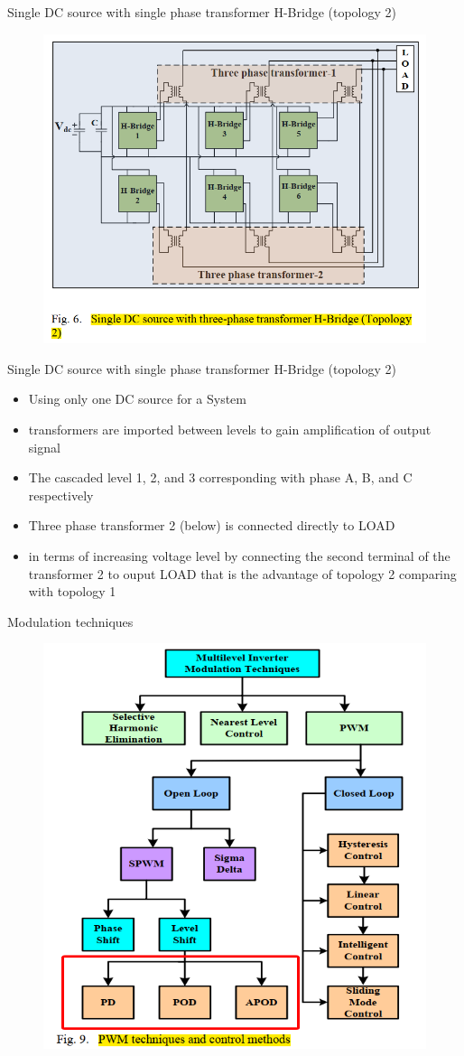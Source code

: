 \documentclass[
	11pt, %
]{beamer}
\begin{document}
\begin{frame}{Single DC source with single phase transformer H-Bridge (topology 2)}
	\begin{figure}
		\includegraphics[width=0.6\linewidth]{Topology2.png}
	\end{figure}
\end{frame}

\begin{frame}{Single DC source with single phase transformer H-Bridge (topology 2)}
	\begin{itemize}
		\setlength{\itemsep}{8pt}
		\item {Using only one DC source for a System}
		\item {transformers are imported between levels to gain amplification of output signal}
		\item {The cascaded level 1, 2, and 3 corresponding with phase A, B, and C respectively}
		\item {Three phase transformer 2 (below) is connected directly to LOAD}
		\item {in terms of increasing voltage level by connecting the second terminal of the transformer 2 to ouput LOAD
		that is the advantage of topology 2 comparing with topology 1}
	\end{itemize}
\end{frame}

\begin{frame}{Modulation techniques}
    \begin{figure}
        \includegraphics[width=0.45\linewidth]{PWD.png}
    \end{figure}
\end{frame}
\end{document}
